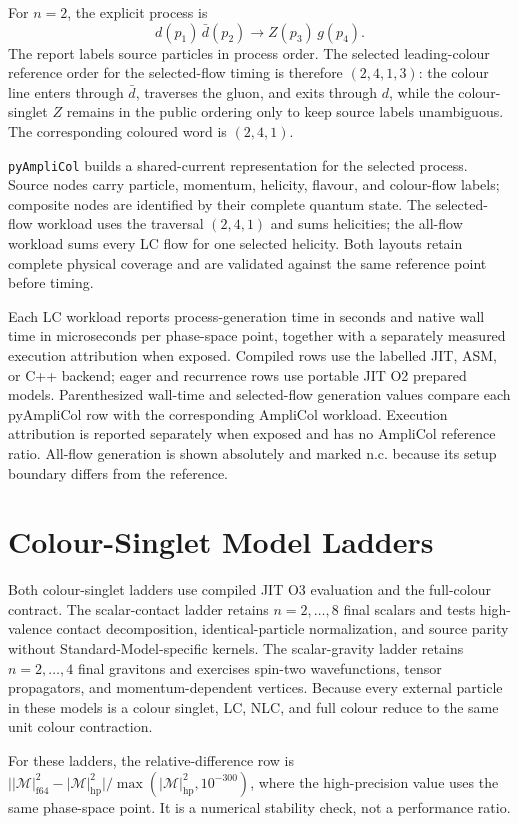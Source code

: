 \documentclass[10pt,letterpaper]{article}
\newif\ifReportLandscapePage
\newcommand{\PAC}{\texttt{pyAmpliCol}}
\newcommand{\ReportTableNote}[1]{\par\smallskip\noindent\footnotesize\textcolor{ReportMuted}{#1}\par}
\newcommand{\ReportLadderLegend}{\ReportTableNote{Each LC workload reports process-generation time in seconds and native wall time in microseconds per phase-space point, together with a separately measured execution attribution when exposed. Compiled rows use the labelled JIT, ASM, or C++ backend; eager and recurrence rows use portable JIT O2 prepared models. Parenthesized wall-time and selected-flow generation values compare each pyAmpliCol row with the corresponding AmpliCol workload. Execution attribution is reported separately when exposed and has no AmpliCol reference ratio. All-flow generation is shown absolutely and marked n.c. because its setup boundary differs from the reference.}}
\newcommand{\ReportLandscapeFooter}{}
\begin{document}
\begin{landscape}
For \(n=2\), the explicit process is
\[
  d(p_1)\,\bar d(p_2)\to Z(p_3)\,g(p_4).
\]
The report labels source particles in process order. The selected leading-colour
reference order for the selected-flow timing is therefore \((2,4,1,3)\): the
colour line enters through \(\bar d\), traverses the gluon, and exits through
\(d\), while the colour-singlet \(Z\) remains in the public ordering only to
keep source labels unambiguous. The corresponding coloured word is
\((2,4,1)\).

\PAC{} builds a shared-current representation for the selected process. Source
nodes carry particle, momentum, helicity, flavour, and colour-flow labels;
composite nodes are identified by their complete quantum state. The
selected-flow workload uses the traversal \((2,4,1)\) and sums helicities; the
all-flow workload sums every LC flow for one selected helicity. Both layouts
retain complete physical coverage and are validated against the same reference
point before timing.

\clearpage

\clearpage

\ReportLadderLegend
\ReportLandscapeFooter
\end{landscape}
\ReportLandscapePagefalse
\clearpage
\pagestyle{fancy}

\section{Colour-Singlet Model Ladders}

Both colour-singlet ladders use compiled JIT O3 evaluation and the full-colour
contract. The scalar-contact ladder retains $n=2,\ldots,8$ final scalars and
tests high-valence contact decomposition, identical-particle normalization,
and source parity without Standard-Model-specific kernels. The scalar-gravity
ladder retains $n=2,\ldots,4$ final gravitons and exercises spin-two
wavefunctions, tensor propagators, and momentum-dependent vertices. Because
every external particle in these models is a colour singlet, LC, NLC, and full
colour reduce to the same unit colour contraction.

For these ladders, the relative-difference row is
\(\bigl||\mathcal M|^2_{\mathrm{f64}}-|\mathcal M|^2_{\mathrm{hp}}\bigr|
/\max(|\mathcal M|^2_{\mathrm{hp}},10^{-300})\), where the high-precision value
uses the same phase-space point. It is a numerical stability check, not a
performance ratio.



\end{document}
